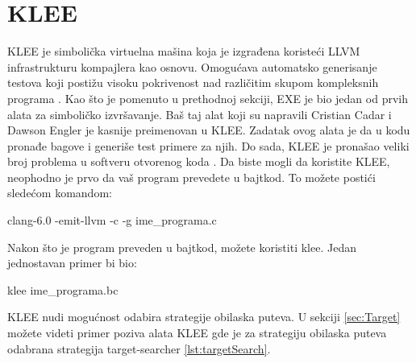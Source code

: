 \documentclass[a4paper]{article}
\begin{document}
\section{KLEE}	
KLEE je simbolička virtuelna mašina koja je izgrađena koristeći LLVM infrastrukturu kompajlera kao osnovu. Omogućava automatsko generisanje testova koji postižu visoku pokrivenost nad različitim skupom kompleksnih programa \cite{kleeDok}. Kao što je pomenuto u prethodnoj sekciji, EXE je bio jedan od prvih alata za simboličko izvršavanje. Baš taj alat koji su napravili Cristian Cadar i Dawson Engler je kasnije preimenovan u KLEE. Zadatak ovog alata je da u kodu pronađe bagove i generiše test primere za njih. Do sada, KLEE je pronašao veliki broj problema u softveru otvorenog koda \cite{kleeRad}. Da biste mogli da koristite KLEE, neophodno je prvo da vaš program prevedete u bajtkod. To možete postići sledećom komandom:
\begin{tcolorbox}[title={Prevođenje programa u bajtkod}]
    clang-6.0 -emit-llvm -c -g ime\_programa.c
\end{tcolorbox}
Nakon što je program preveden u bajtkod, možete koristiti klee. Jedan jednostavan primer bi bio:
\begin{tcolorbox}[title={Primer korišćenja KLEE alata}]
    klee ime\_programa.bc
\end{tcolorbox}
KLEE nudi mogućnost odabira strategije obilaska puteva. U sekciji \ref{sec:Target} možete videti primer poziva alata KLEE gde je za strategiju obilaska puteva odabrana strategija target-searcher \ref{lst:targetSearch}.
\newpage
\end{document}
